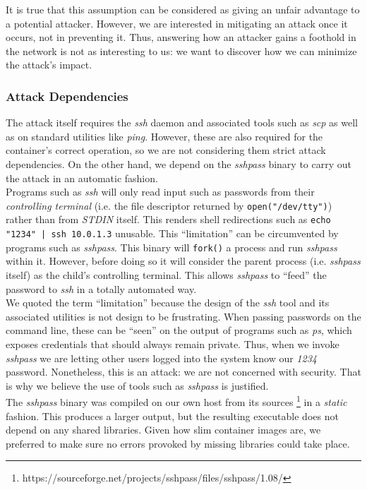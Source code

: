             It is true that this assumption can be considered as giving an unfair advantage to a potential attacker. However, we are interested in mitigating an attack once it occurs, not in preventing it. Thus, answering how an attacker gains a foothold in the network is not as interesting to us: we want to discover how we can minimize the attack's impact.\\

        \subsubsection{Attack Dependencies}
            The attack itself requires the \textit{ssh} daemon and associated tools such as \textit{scp} as well as on standard utilities like \textit{ping}. However, these are also required for the container's correct operation, so we are not considering them strict attack dependencies. On the other hand, we depend on the \textit{sshpass} binary to carry out the attack in an automatic fashion.\\

            Programs such as \textit{ssh} will only read input such as passwords from their \textit{controlling terminal} (i.e. the file descriptor returned by \texttt{open("/dev/tty")}) rather than from \textit{STDIN} itself. This renders shell redirections such as \texttt{echo "1234" | ssh 10.0.1.3} unusable. This ``limitation'' can be circumvented by programs such as \textit{sshpass}. This binary will \texttt{fork()} a process and run \textit{sshpass} within it. However, before doing so it will consider the parent process (i.e. \textit{sshpass} itself) as the child's controlling terminal. This allows \textit{sshpass} to ``feed'' the password to \textit{ssh} in a totally automated way.\\

            We quoted the term ``limitation'' because the design of the \textit{ssh} tool and its associated utilities is not design to be frustrating. When passing passwords on the command line, these can be ``seen'' on the output of programs such as \textit{ps}, which exposes credentials that should always remain private. Thus, when we invoke \textit{sshpass} we are letting other users logged into the system know our \textit{1234} password. Nonetheless, this is an attack: we are not concerned with security. That is why we believe the use of tools such as \textit{sshpass} is justified.\\

            The \textit{sshpass} binary was compiled on our own host from its sources \footnote{https://sourceforge.net/projects/sshpass/files/sshpass/1.08/} in a \textit{static} fashion. This produces a larger output, but the resulting executable does not depend on any shared libraries. Given how slim container images are, we preferred to make sure no errors provoked by missing libraries could take place.\\

